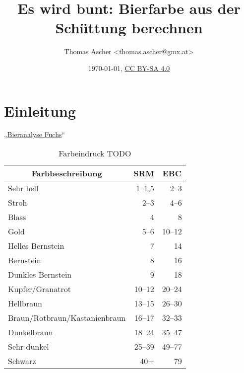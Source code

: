 \documentclass[a4paper,parskip=half]{scrartcl}
\title{Es wird bunt: Bierfarbe aus der Schüttung berechnen}
\author{Thomas Ascher <thomas.ascher@gmx.at>}
\date{\today, \href{http://creativecommons.org/licenses/by-sa/4.0/}{CC BY-SA 4.0}}
\begin{document}
\maketitle

\section*{Einleitung}

„\href{https://bieranalyse.de}{Bieranalyse Fuchs}“


\begin{table}[H]
\centering
\begin{tabular}{lrr}
\toprule
\multicolumn{1}{c}{\textbf{Farbbeschreibung}} & \multicolumn{1}{c}{\textbf{SRM}} & \multicolumn{1}{c}{\textbf{EBC}} \\
\midrule
Sehr hell & 1–1,5 & 2–3  \\
Stroh & 2–3 & 4–6 \\
Blass & 4 & 8 \\
Gold & 5–6 & 10–12 \\
Helles Bernstein & 7 & 14 \\
Bernstein & 8 & 16 \\
Dunkles Bernstein & 9 & 18 \\
Kupfer/Granatrot & 10–12 & 20–24 \\
Hellbraun & 13–15 & 26–30 \\
Braun/Rotbraun/Kastanienbraun & 16–17 & 32–33 \\
Dunkelbraun & 18–24 & 35–47 \\
Sehr dunkel & 25–39 & 49–77 \\
Schwarz & 40+ & 79 \\
\bottomrule
\end{tabular}
\caption{Farbeindruck TODO \parencite{BA2021}}
\label{table:bacolor}
\end{table}

\parencite{BA2021}
\end{document}

